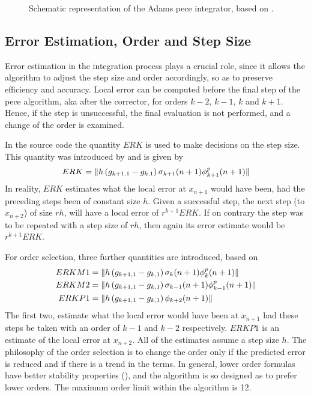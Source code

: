 \begin{figure}
  \centering
  
  \caption{Schematic representation of the Adams \gls{pece} integrator, based 
    on \cite{Shampine1975}.}
  \label{fig:adams-pece}
\end{figure}

\subsection{Error Estimation, Order and Step Size}\label{ssec:integrator-error-estimation}
Error estimation in the integration process plays a crucial role, since it allows 
the algorithm to adjust the step size and order accordingly, so as to preserve 
efficiency and accuracy. Local error can be computed before the final step of the 
\gls{pece} algorithm, aka after the corrector, for orders $k-2$, $k-1$, $k$ and 
$k+1$. Hence, if the step is unsuccessful, the final evaluation is not performed, 
and a change of the order is examined.

In the source code the quantity $ERK$ is used to make decisions on the step size. 
This quantity was introduced by \cite{Shampine1975} and is given by
\begin{equation}
  ERK = \lVert h \left( g_{k+1,1} - g_{k,1} \right) \sigma _{k+1}(n+1) \phi ^{p}_{k+1}(n+1)\rVert
\end{equation}
In reality, $ERK$ estimates what the local error at $x_{n+1}$ would have been, 
had the preceding steps been of constant size $h$. Given a successful step, the 
next step (to $x_{n+2}$) of size $rh$, will have a local error of $r^{k+1} ERK$. 
If on contrary the step was to be repeated with a step size of $rh$, then again 
its error estimate would be $r^{k+1} ERK$.

For order selection, three further quantities are introduced, based on \cite{Shampine1975}
\begin{align}
  ERKM1 &= \lVert h \left( g_{k+1,1} - g_{k,1} \right) \sigma _{k}(n+1) \phi ^{p}_{k}(n+1)\rVert \\
  ERKM2 &= \lVert h \left( g_{k+1,1} - g_{k,1} \right) \sigma _{k-1}(n+1) \phi ^{p}_{k-1}(n+1)\rVert\\
  ERKP1 &= \lVert h \left( g_{k+1,1} - g_{k,1} \right) \phi _{k+2}(n+1)\rVert
\end{align}
The first two, estimate what the local error would have been at $x_{n+1}$ had these 
steps be taken with an order of $k-1$ and $k-2$ respectively. $ERKP1$ is an estimate 
of the local error at $x_{n+2}$. All of the estimates assume a step size $h$. 
The philosophy of the order selection is to change the order only if the predicted 
error is reduced and if there is a trend in the terms. In general, lower order 
formulas have better stability properties (\cite{Shampine1975}), and the algorithm 
is so designed as to prefer lower orders. The maximum order limit within the 
algorithm is 12.

